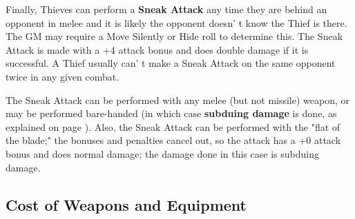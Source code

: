 \documentclass[a4paper,twoside,openany,10pt]{book}
\begin{document}
\begin{multicols}{2}
Finally, Thieves can perform a \hypertarget{Sneakux20Attackux20Thiefux20Ability}{}{}\textbf{Sneak
Attack} any time they are behind an opponent in melee and it is likely the opponent doesn' t know the Thief is there. The GM may require a Move Silently or Hide roll to determine this. The Sneak Attack is made with a +4 attack bonus and does double damage if it is successful. A Thief usually can' t make a Sneak Attack on the same opponent twice in any given combat.

The Sneak Attack can be performed with any melee (but not missile) weapon, or may be performed bare-handed (in which case \textbf{subduing damage} is done, as explained on page \hyperlink{subduing-damage}{\pageref{subduing-damage}}). Also, the Sneak Attack can be performed with the "flat of the blade;" the bonuses and penalties cancel out, so the attack has a +0 attack bonus and does normal damage; the damage done in this case is subduing damage.

\end{multicols}

\pagebreak

\subsection{Cost of Weapons and Equipment}

\label{cost-of-weapons-and-equipment}\hypertarget{cost-of-weapons-and-equipment}{} 
\end{document}
